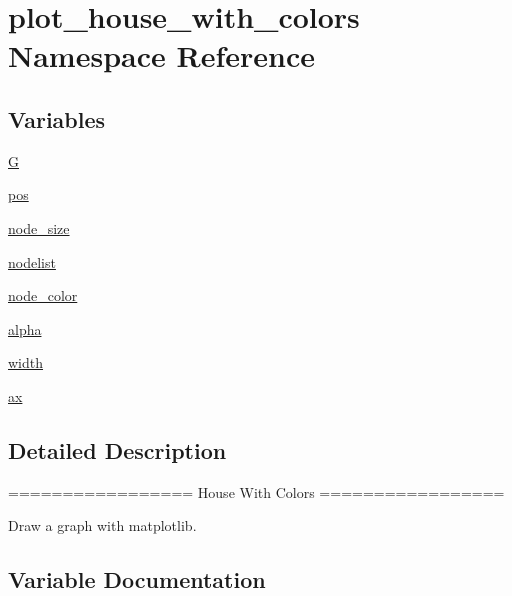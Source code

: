 \hypertarget{namespaceplot__house__with__colors}{}\section{plot\+\_\+house\+\_\+with\+\_\+colors Namespace Reference}
\label{namespaceplot__house__with__colors}
\subsection*{Variables}
\begin{DoxyCompactItemize}
\item 
\hyperlink{namespaceplot__house__with__colors_af97f9a445190c552398a7b0ae8c69ce7}{G}
\item 
\hyperlink{namespaceplot__house__with__colors_ae99104375d2fd2698827ef0d0fb3276d}{pos}
\item 
\hyperlink{namespaceplot__house__with__colors_a2ef123bd2657a90d1dafc35e966d0dca}{node\+\_\+size}
\item 
\hyperlink{namespaceplot__house__with__colors_a21ebf6d532e36b85bacec65dd338ed70}{nodelist}
\item 
\hyperlink{namespaceplot__house__with__colors_aad51feec4f3bbfcf93c574ed01e3a026}{node\+\_\+color}
\item 
\hyperlink{namespaceplot__house__with__colors_a00c503280276a160c24b50be5f65aa75}{alpha}
\item 
\hyperlink{namespaceplot__house__with__colors_a36b02763546a55de24dd14171fc05d15}{width}
\item 
\hyperlink{namespaceplot__house__with__colors_ab0facdba0d400724ca565c2d46147a45}{ax}
\end{DoxyCompactItemize}


\subsection{Detailed Description}
\begin{DoxyVerb}=================
House With Colors
=================

Draw a graph with matplotlib.
\end{DoxyVerb}
 

\subsection{Variable Documentation}
\mbox{\label{namespaceplot__house__with__colors_a00c503280276a160c24b50be5f65aa75}} 
